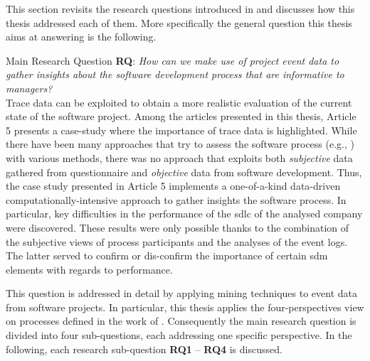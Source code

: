 This section revisits the research questions introduced in  and discusses how this thesis addressed each of them. More specifically the general question this thesis aims at answering is the following.
\begin{question}{Main Research Question}
	\textbf{RQ}: \emph{How can we make use of project event data to gather insights about the software development process that are informative to managers?}\\
	 
	
	
	Trace data can be exploited to obtain a more realistic evaluation of the current state of the software project. Among the articles presented in this thesis, Article 5 presents a case-study where the importance of trace data is highlighted. While there have been many approaches that try to assess the software process (e.g., \citep{DBLP:journals/bise/VavpoticRH20,hovelja2015exploring,atkinson1999project}) with various methods, there was no approach that exploits both \emph{subjective} data gathered from questionnaire and \emph{objective} data from software development. Thus, the case study presented in Article 5 implements a one-of-a-kind data-driven computationally-intensive approach \citep{DBLP:journals/isr/BerenteSS19} to gather insights the software process. 
	In particular, key difficulties in the performance of the \gls{sdlc} of the analysed company were discovered. These results were only possible thanks to the combination of the subjective views of process participants and the analyses of the event logs. The latter served to confirm or dis-confirm the importance of certain \gls{sdm} elements with regards to performance.
	
\end{question}

This question is addressed in detail by applying mining techniques to event data from software projects. In particular, this thesis applies the four-perspectives view on processes defined in the work of \cite{DBLP:books/sp/Aalst16}. Consequently the main research question is divided into four sub-questions, each addressing one specific perspective.  In the following, each research sub-question \textbf{RQ1} – \textbf{RQ4} is discussed.\\


